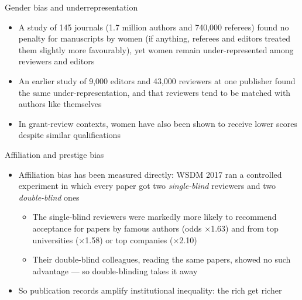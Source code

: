 \documentclass[aspectratio=169]{beamer}
\begin{document}
\begin{frame}{Gender bias and underrepresentation}
\begin{itemize}
  \item A study of 145 journals (1.7 million authors and 740,000 referees) found no penalty for manuscripts by women (if anything, referees and editors treated them slightly more favourably), yet women remain under-represented among reviewers and editors \citep{squazzoni2021genderbias}
  \item An earlier study of 9,000 editors and 43,000 reviewers at one publisher found the same under-representation, and that reviewers tend to be matched with authors like themselves \citep{helmer2017genderbias,murray2018homophily}
  \item In grant-review contexts, women have also been shown to receive lower scores despite similar qualifications
    \citep{wenneras1997nepotism}
  \end{itemize}
\end{frame}

\begin{frame}{Affiliation and prestige bias}
\begin{itemize}
\item Affiliation bias has been measured directly: WSDM 2017 ran a controlled experiment in which every paper got two \emph{single-blind} reviewers and two \emph{double-blind} ones \citep{tomkins2017dblblind}
    \begin{itemize}
    \item The single-blind reviewers were markedly more likely to recommend acceptance for papers by famous authors (odds $\times$1.63) and from top universities ($\times$1.58) or top companies ($\times$2.10)
    \item Their double-blind colleagues, reading the same papers, showed no such advantage --- so double-blinding takes it away
    \end{itemize}
  \item So publication records amplify institutional inequality: the rich get richer
\end{itemize}
\end{frame}
\end{document}
